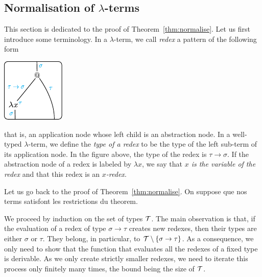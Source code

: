 \subsection{Normalisation of $\lambda$-terms}\label{sec:evaluation-lambda}


This section is dedicated to the proof of Theorem~\ref{thm:normalise}. Let us first introduce some terminology. In a $\lambda$-term, we call \emph{redex} a pattern of the following form 
\begin{center}
\includegraphics[scale=1.2]{pictures/redex.pdf}
\end{center}
that is, an application node whose left child is an abstraction node. In a well-typed $\lambda$-term, we define the \emph{type of a redex} to be the type of the left sub-term of its application node. In the figure above, the type of the redex is $\tau\rightarrow\sigma$. If the abstraction node of a redex is labeled by $\lambda x$, we say that \emph{$x$ is the variable of the redex} and that this redex is an \emph{$x$-redex}. 

Let us go back to the proof of Theorem~\ref{thm:normalise}. 
On suppose que nos terms satisfont les restrictions du theorem.

We proceed by induction on the set of types ${\mathcal T}$. The main observation is that, if the evaluation of a redex of type $\sigma\rightarrow \tau$ creates new redexes, then their types are either $\sigma$ or $\tau$. They belong, in particular, to  ${\mathcal T}\setminus\{\sigma\rightarrow\tau\}$. As a consequence, we only need to show that the function that evaluates all the redexes of a fixed type is derivable. As we only create strictly smaller redexes, we need to iterate this process only finitely many times, the bound being the size of ${\mathcal T}$. 

